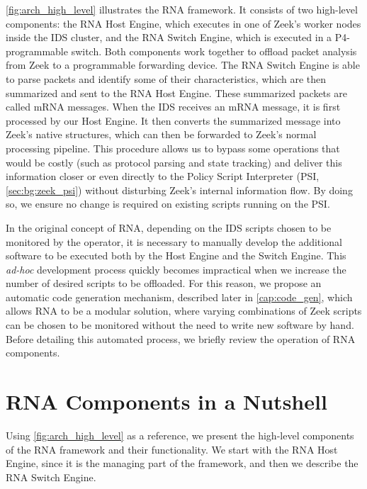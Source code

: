 \autoref{fig:arch_high_level} illustrates the RNA framework. It consists of two high-level components: the RNA Host Engine, which executes in one of Zeek's worker nodes inside the IDS cluster, and the RNA Switch Engine, which is executed in a P4-programmable switch. Both components work together to offload packet analysis from Zeek to a programmable forwarding device. The RNA Switch Engine is able to parse packets and identify some of their characteristics, which are then summarized and sent to the RNA Host Engine. These summarized packets are called mRNA messages. When the IDS receives an mRNA message, it is first processed by our Host Engine. It then converts the summarized message into Zeek's native structures, which can then be forwarded to Zeek's normal processing pipeline. This procedure allows us to bypass some operations that would be costly (such as protocol parsing and state tracking) and deliver this information closer or even directly to the Policy Script Interpreter (PSI, \autoref{sec:bg:zeek_psi}) without disturbing Zeek's internal information flow. By doing so, we ensure no change is required on existing scripts running on the PSI.

In the original concept of RNA, depending on the IDS scripts chosen to be monitored by the operator, it is necessary to manually develop the additional software to be executed both by the Host Engine and the Switch Engine. This \textit{ad-hoc} development process quickly becomes impractical when we increase the number of desired scripts to be offloaded. For this reason, we propose an automatic code generation mechanism, described later in \autoref{cap:code_gen}, which allows RNA to be a modular solution, where varying combinations of Zeek scripts can be chosen to be monitored without the need to write new software by hand. Before detailing this automated process, we briefly review the operation of RNA components.

\section{RNA Components in a Nutshell}
\label{sec:rna:overview}

Using \autoref{fig:arch_high_level} as a reference, we present the high-level components of the RNA framework and their functionality. We start with the RNA Host Engine, since it is the managing part of the framework, and then we describe the RNA Switch Engine.

